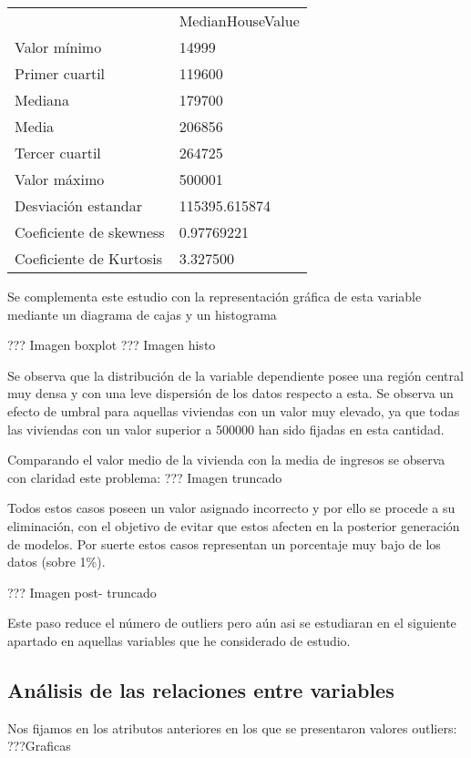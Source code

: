 {\begin{table}[]
	\begin{tabular}{ll}
		& MedianHouseValue \\
		Valor mínimo            & 14999            \\
		Primer cuartil          & 119600           \\
		Mediana                 & 179700           \\
		Media                   & 206856           \\
		Tercer cuartil          & 264725           \\
		Valor máximo            & 500001           \\ \hline
		Desviación estandar     & 115395.615874    \\ \hline
		Coeficiente de skewness & 0.97769221       \\
		Coeficiente de Kurtosis & 3.327500        
	\end{tabular}
\end{table}

Se complementa este estudio con la representación gráfica de esta variable mediante un diagrama de cajas y un histograma

??? Imagen boxplot
??? Imagen histo

Se observa que la distribución de la variable dependiente posee una región central muy densa y con una leve dispersión de los datos respecto a esta. Se observa un efecto de umbral para aquellas viviendas con un valor muy elevado, ya que todas las viviendas con un valor superior a 500000 han sido fijadas en esta cantidad. 

Comparando el valor medio de la vivienda con la media de ingresos se observa con claridad este problema:
??? Imagen truncado

Todos estos casos poseen un valor asignado incorrecto y por ello se procede a su eliminación, con el objetivo de evitar que estos afecten en la posterior generación de modelos. Por suerte estos casos representan un porcentaje muy bajo de los datos (sobre 1\%).

??? Imagen post- truncado

Este paso reduce el número de outliers pero aún asi se estudiaran en el siguiente apartado en aquellas variables que he considerado de estudio.


\subsection{Análisis de las relaciones entre variables}
Nos fijamos en los atributos anteriores en los que se presentaron valores outliers:
???Graficas

}
